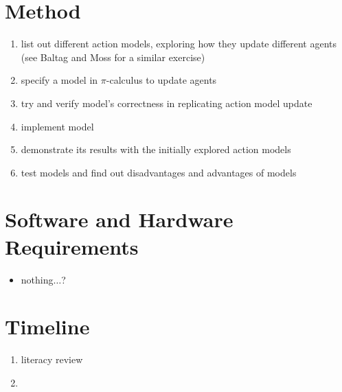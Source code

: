\documentclass[12pt, a4paper]{article}
\begin{document}
\section*{Method}

\begin{enumerate}
  \item list out different action models, exploring how they update
    different agents (see Baltag and Moss for a similar exercise)
  \item specify a model in $\pi$-calculus to update agents
  \item try and verify model's correctness in replicating action model update
  \item implement model
  \item demonstrate its results with the initially explored action models
  \item test models and find out disadvantages and advantages of models
\end{enumerate}

\section*{Software and Hardware Requirements}

\begin{itemize}
  \item nothing$\ldots$?
\end{itemize}

\section*{Timeline}

\begin{enumerate}
  \item literacy review
  \item 
\end{enumerate}

\end{document}
